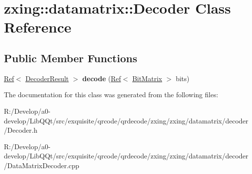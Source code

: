 \hypertarget{classzxing_1_1datamatrix_1_1_decoder}{}\section{zxing\+:\+:datamatrix\+:\+:Decoder Class Reference}
\label{classzxing_1_1datamatrix_1_1_decoder}
\subsection*{Public Member Functions}
\begin{DoxyCompactItemize}
\item 
\mbox{\label{classzxing_1_1datamatrix_1_1_decoder_aae80cc125f8a31f0782de9738bd04062}} 
\mbox{\hyperlink{classzxing_1_1_ref}{Ref}}$<$ \mbox{\hyperlink{classzxing_1_1_decoder_result}{Decoder\+Result}} $>$ {\bfseries decode} (\mbox{\hyperlink{classzxing_1_1_ref}{Ref}}$<$ \mbox{\hyperlink{classzxing_1_1_bit_matrix}{Bit\+Matrix}} $>$ bits)
\end{DoxyCompactItemize}


The documentation for this class was generated from the following files\+:\begin{DoxyCompactItemize}
\item 
R\+:/\+Develop/a0-\/develop/\+Lib\+Q\+Qt/src/exquisite/qrcode/qrdecode/zxing/zxing/datamatrix/decoder/Decoder.\+h\item 
R\+:/\+Develop/a0-\/develop/\+Lib\+Q\+Qt/src/exquisite/qrcode/qrdecode/zxing/zxing/datamatrix/decoder/Data\+Matrix\+Decoder.\+cpp\end{DoxyCompactItemize}
